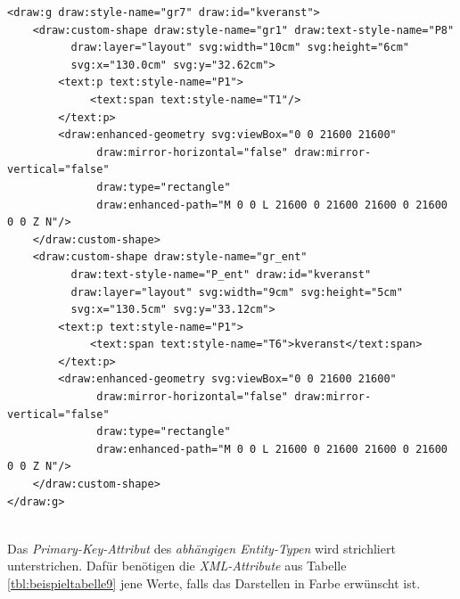 \begin{verbatim}
<draw:g draw:style-name="gr7" draw:id="kveranst">
    <draw:custom-shape draw:style-name="gr1" draw:text-style-name="P8" 
          draw:layer="layout" svg:width="10cm" svg:height="6cm" 
          svg:x="130.0cm" svg:y="32.62cm">
        <text:p text:style-name="P1">
             <text:span text:style-name="T1"/>
        </text:p>
        <draw:enhanced-geometry svg:viewBox="0 0 21600 21600" 
              draw:mirror-horizontal="false" draw:mirror-vertical="false" 
              draw:type="rectangle" 
              draw:enhanced-path="M 0 0 L 21600 0 21600 21600 0 21600 0 0 Z N"/>
    </draw:custom-shape>
    <draw:custom-shape draw:style-name="gr_ent" 
          draw:text-style-name="P_ent" draw:id="kveranst" 
          draw:layer="layout" svg:width="9cm" svg:height="5cm" 
          svg:x="130.5cm" svg:y="33.12cm">
        <text:p text:style-name="P1">
             <text:span text:style-name="T6">kveranst</text:span>
        </text:p>
        <draw:enhanced-geometry svg:viewBox="0 0 21600 21600" 
              draw:mirror-horizontal="false" draw:mirror-vertical="false" 
              draw:type="rectangle" 
              draw:enhanced-path="M 0 0 L 21600 0 21600 21600 0 21600 0 0 Z N"/>
    </draw:custom-shape>
</draw:g>
\end{verbatim} 
\noindent
\hon{}
\\
\noindent
Das \textit{Primary-Key-Attribut} des \textit{abhängigen Entity-Typen} wird strichliert unterstrichen.
Dafür benötigen die \textit{XML-Attribute} aus Tabelle \ref{tbl:beispieltabelle9} jene Werte, falls das Darstellen in Farbe erwünscht ist.

